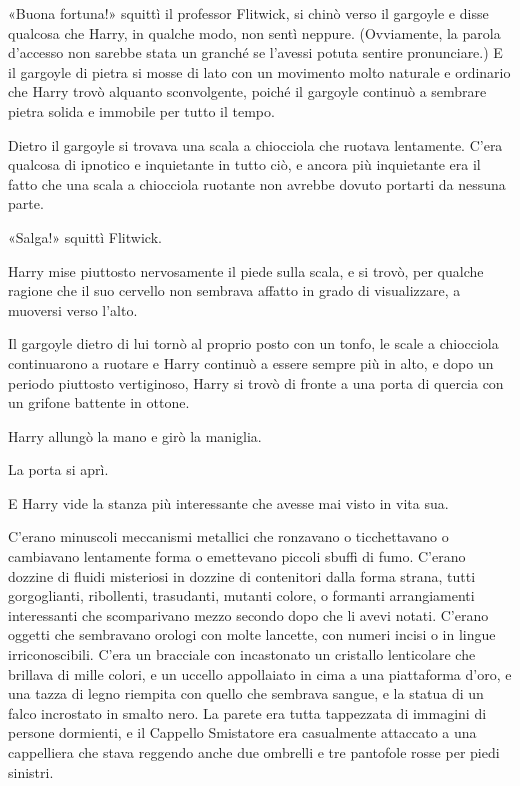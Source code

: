 «Buona fortuna!» squittì il professor Flitwick, si chinò verso il gargoyle e disse qualcosa che Harry, in qualche modo, non sentì neppure. (Ovviamente, la parola d’accesso non sarebbe stata un granché se l’avessi potuta sentire pronunciare.) E il gargoyle di pietra si mosse di lato con un movimento molto naturale e ordinario che Harry trovò alquanto sconvolgente, poiché il gargoyle continuò a sembrare pietra solida e immobile per tutto il tempo.

Dietro il gargoyle si trovava una scala a chiocciola che ruotava lentamente. C’era qualcosa di ipnotico e inquietante in tutto ciò, e ancora più inquietante era il fatto che una scala a chiocciola ruotante non avrebbe dovuto portarti da nessuna parte.

«Salga!» squittì Flitwick.

Harry mise piuttosto nervosamente il piede sulla scala, e si trovò, per qualche ragione che il suo cervello non sembrava affatto in grado di visualizzare, a muoversi verso l’alto.

Il gargoyle dietro di lui tornò al proprio posto con un tonfo, le scale a chiocciola continuarono a ruotare e Harry continuò a essere sempre più in alto, e dopo un periodo piuttosto vertiginoso, Harry si trovò di fronte a una porta di quercia con un grifone battente in ottone.

Harry allungò la mano e girò la maniglia.

La porta si aprì.

E Harry vide la stanza più interessante che avesse mai visto in vita sua.

C’erano minuscoli meccanismi metallici che ronzavano o ticchettavano o cambiavano lentamente forma o emettevano piccoli sbuffi di fumo. C’erano dozzine di fluidi misteriosi in dozzine di contenitori dalla forma strana, tutti gorgoglianti, ribollenti, trasudanti, mutanti colore, o formanti arrangiamenti interessanti che scomparivano mezzo secondo dopo che li avevi notati. C’erano oggetti che sembravano orologi con molte lancette, con numeri incisi o in lingue irriconoscibili. C’era un bracciale con incastonato un cristallo lenticolare che brillava di mille colori, e un uccello appollaiato in cima a una piattaforma d’oro, e una tazza di legno riempita con quello che sembrava sangue, e la statua di un falco incrostato in smalto nero. La parete era tutta tappezzata di immagini di persone dormienti, e il Cappello Smistatore era casualmente attaccato a una cappelliera che stava reggendo anche due ombrelli e tre pantofole rosse per piedi sinistri.


